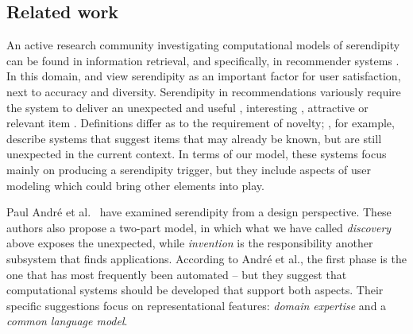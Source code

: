 \subsection{Related work} \label{sec:related}

An active research community investigating computational models of serendipity can be found in information retrieval, and specifically, in recommender systems \cite{Toms2000}. In this domain,  and  view serendipity as an important factor for user satisfaction, next to accuracy and diversity.  Serendipity in recommendations variously require the system to deliver an unexpected and useful \cite{Lu2012}, interesting \cite{Herlocker2004}, attractive or relevant item \cite{Ge2010}. 
Definitions differ as to the requirement of novelty; , for example, describe systems that suggest items that may already be known, but are still unexpected in the current context.  In terms of our model, these systems focus mainly on producing a serendipity trigger, but they include aspects of user modeling which could bring other elements into play.

Paul Andr{\'e} et al.~\citeyear{andre2009discovery} have examined
serendipity from a design perspective.  These authors also propose a
two-part model, in which what we have called \emph{discovery} above
exposes the unexpected, while \emph{invention} is the responsibility
another subsystem that finds applications.  According to Andr\'e et
al., the first phase is the one that has most frequently been
automated -- but they suggest that computational systems should be
developed that support both aspects.  Their specific suggestions focus
on representational features: \emph{domain expertise} and a
\emph{common language model}.

